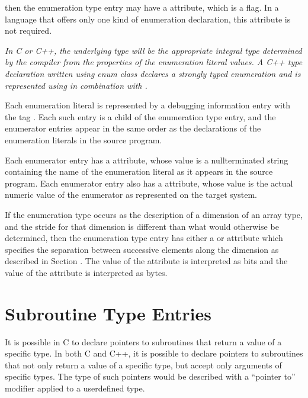 then the enumeration type entry may have a 
attribute, which is a flag. In a language that offers only
one kind of enumeration declaration, this attribute is not
required.

\textit{In C or C++, the underlying type will be the appropriate
integral type determined by the compiler from the properties of
the enumeration literal values. A C++ type declaration written
using enum class declares a strongly typed enumeration and
is represented using  in combination
with .}

Each enumeration literal is represented by a debugging
information entry with the 
tag . 
Each
such entry is a child of the enumeration type entry, and the
enumerator entries appear in the same order as the declarations
of the enumeration literals in the source program.

Each enumerator entry has a  attribute, whose
value is a null\dash terminated string containing the name of the
enumeration literal as it appears in the source program. Each
enumerator entry also has a  attribute,
whose value is the actual numeric value of the enumerator as
represented on the target system.


If the enumeration type occurs as the description of a
dimension of an array type, and the stride for that dimension
is different than what would otherwise be determined, then
the enumeration type entry has either a 
or  attribute which specifies the separation
between successive elements along the dimension as described
in 
Section . 
The value of the  attribute
is interpreted as bits and the value of the 
attribute is interpreted as bytes.


\section{Subroutine Type Entries}
\label{chap:subroutinetypeentries}

It is possible in C to declare pointers to subroutines
that return a value of a specific type. In both C and C++,
it is possible to declare pointers to subroutines that not
only return a value of a specific type, but accept only
arguments of specific types. The type of such pointers would
be described with a ``pointer to'' modifier applied to a
user\dash defined type.


